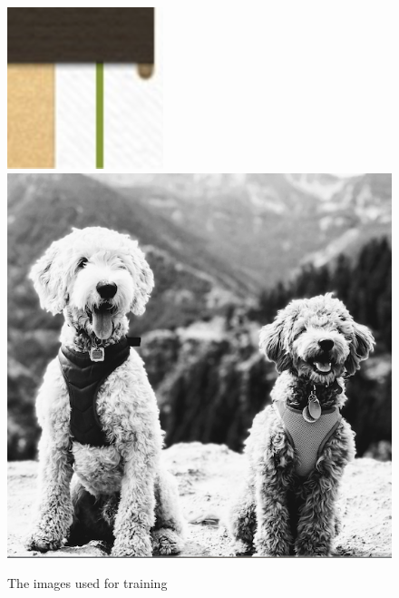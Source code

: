 \documentclass[11pt]{article}
\begin{document}
\begin{figure}[!htb]
\begin{center}
\begin{multicols}{3}
	\includegraphics[height = \linewidth]{test}\
	\includegraphics[height = \linewidth]{targetpractice}\par
\end{multicols}
\caption{The images used for training}
\end{center}
\end{figure}
\end{document}
